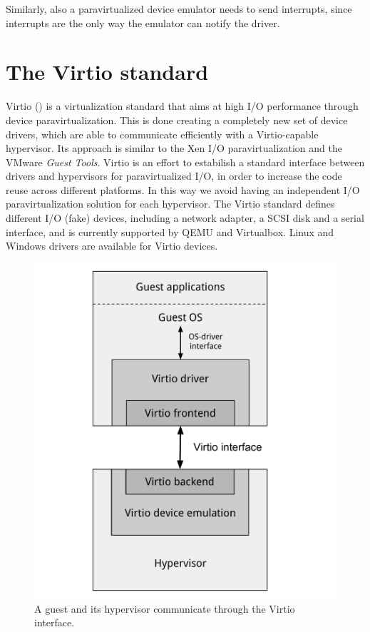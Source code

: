 Similarly, also a paravirtualized device emulator needs to send interrupts, since interrupts are the only way the emulator can notify
the driver.


\section{The Virtio standard}
Virtio (\cite{ref:virtio}) is a virtualization standard that aims at high I/O performance through device paravirtualization. This is done
creating a completely new set of device drivers, which are able to communicate efficiently with a Virtio-capable hypervisor. Its approach is
similar to the Xen I/O paravirtualization and the VMware \emph{Guest Tools}.
Virtio is an effort to estabilish a standard interface between drivers and hypervisors for paravirtualized I/O, in order to increase the 
code reuse across different platforms. In this way we avoid having an independent I/O paravirtualization solution for each hypervisor.
The Virtio standard defines different I/O (fake) devices, including a network adapter, a SCSI disk and a serial interface, and is currently
supported by QEMU and Virtualbox. Linux and Windows drivers are available for Virtio devices.

\begin{figure}[bt]
\centering
\includegraphics[scale = 0.45]{virtio.pdf}
\caption{A guest and its hypervisor communicate through the Virtio interface.}
\label{fig:virtio}
\end{figure}

